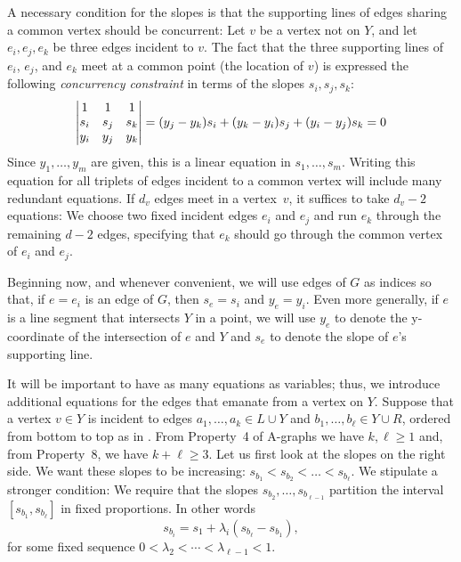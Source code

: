 \documentclass{patmorin}
\begin{document}
A necessary condition for the slopes is that the supporting lines of edges 
sharing 
a common vertex should be concurrent: Let $v$ be a vertex 
not on $Y$, and let $e_i, e_j, e_k$ be three edges incident to $v$.
The fact that the three supporting lines of $e_i$, $e_j$, and $e_k$
meet at a common point (the location of $v$) is expressed the following
\emph{concurrency constraint} in terms of the slopes $s_i,s_j,s_k$:
\begin{equation}\eqlabel{slope0} 
\left|
  \begin{matrix}
    1&1&1\\
s_i&s_j&s_k\\
y_i&y_j&y_k
  \end{matrix}
\right|=
   ({y_j-y_k}) s_i + ({y_k-y_i}) s_j 
          + ({y_i-y_j})s_k  = 0
\end{equation}
Since $y_1,\ldots,y_m$ are given, this is a linear equation
in $s_1,\ldots,s_m$.
Writing this equation for all triplets of edges incident to a common
vertex will include many redundant equations.
If $d_v$ edges meet in a vertex~$v$, 
 it suffices to take $d_v-2$ equations: We choose two fixed
incident edges $e_i$ and $e_j$ and run $e_k$ through the remaining
$d-2$ edges, specifying that $e_k$ should go through the common vertex
of $e_i$ and $e_j$.

Beginning now, and whenever convenient, we will use edges of $G$
as indices so that, if $e=e_i$ is an edge of $G$, then $s_e=s_i$
and $y_e=y_i$.  Even more generally, if $e$ is a line segment that
intersects $Y$ in a point, we will use $y_e$ to denote the y-coordinate
of the intersection of $e$ and $Y$ and $s_e$ to denote the slope of
$e$'s supporting line.

It will be important to have as many equations as variables;
thus, we introduce additional equations for the edges that emanate from a
vertex on $Y$.
Suppose that a vertex $v\in Y$ is incident to edges $a_1,\ldots,a_k\in L\cup Y$ 
and $b_1,\ldots,b_\ell\in Y\cup R$, ordered from bottom to top as in .
From Property~4 of A-graphs we have $k,\ell\ge1$ and, from Property~8, we have $k+\ell\ge 3$.
Let us first look at the slopes on the right side.
We want these slopes to be increasing:
$s_{b_1} < s_{b_2} < \dots  <s_{b_\ell}$. We stipulate a stronger
condition:
We require that the slopes
$s_{b_2}, \dots, s_{b_{\ell-1}}$ partition the interval
$[s_{b_1},s_{b_\ell}]$ in fixed proportions. In other words
\begin{equation}
  \label{eq:proportion}
s_{b_i} = s_1 + \lambda_i(s_{b_{\ell}}-s_{b_1}),
\end{equation}
for some fixed sequence $0<\lambda_2<\cdots<\lambda_{\ell-1}<1$.
\end{document}

